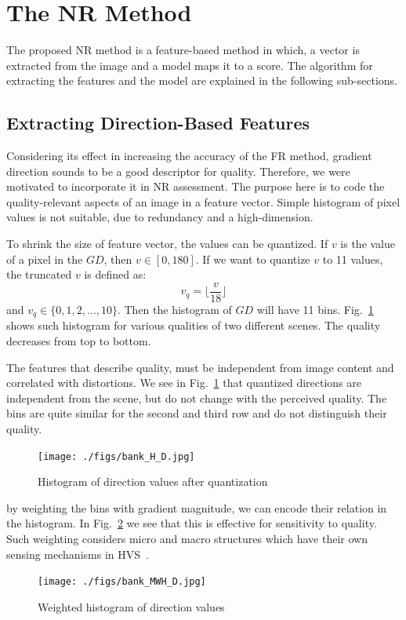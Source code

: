\section{The NR Method}
The proposed NR method is a feature-based method in which, a vector is extracted from the image and a model maps it to a score. The algorithm for extracting the features and the model are explained in the following sub-sections.
\subsection{Extracting Direction-Based Features}
Considering its effect in increasing the accuracy of the FR method, gradient direction sounds to be a good descriptor for quality. Therefore, we were motivated to incorporate it in NR assessment. The purpose here is to code the quality-relevant aspects of an image in a feature vector. Simple histogram of pixel values is not suitable, due to redundancy and a high-dimension.

To shrink the size of feature vector, the values can be quantized. If $v$ is the value of a pixel in the $GD$, then $v\in[0, 180]$. If we want to quantize $v$ to 11 values, the truncated $v$ is defined as:
\begin{equation}
    v_q = \lfloor \frac{v}{18} \rfloor
    \label{eq:qdir}
\end{equation}
and $v_q\in \{0, 1, 2, \ldots, 10\}$. Then the histogram of $GD$ will have 11 bins. Fig.~\ref{fig:hst_dir} shows such histogram for various qualities of two different scenes. The quality decreases from top to bottom.

The features that describe quality, must be independent from image content and correlated with distortions. We see in Fig.~\ref{fig:hst_dir} that quantized directions are independent from the scene, but do not change with the perceived quality. The bins are quite similar for the second and third row and do not distinguish their quality.
\begin{figure}
         \centering
         \texttt{[image: ./figs/bank\_H\_D.jpg]}
     \caption{Histogram of direction values after quantization}
        \label{fig:hst_dir}
\end{figure}

by weighting the bins with gradient magnitude, we can encode their relation in the histogram. In Fig.~\ref{fig:hst_w_dir} we see that this is effective for sensitivity to quality. Such weighting considers micro and macro structures which have their own sensing mechanisms in HVS~\cite{Griffin2007}.
\begin{figure}
         \centering
         \texttt{[image: ./figs/bank\_MWH\_D.jpg]}
     \caption{Weighted histogram of direction values}
        \label{fig:hst_w_dir}
\end{figure}

